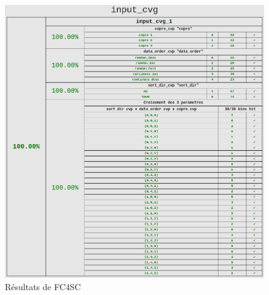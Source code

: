 \documentclass[a4paper, 10pt]{article}
\begin{document}
\begin{figure}[htpb]
	\centering
	\includegraphics[width=\linewidth]{coverage}
	\caption{Résultats de FC4SC}
	\label{fig:fc4sc}
\end{figure}
\end{document}
